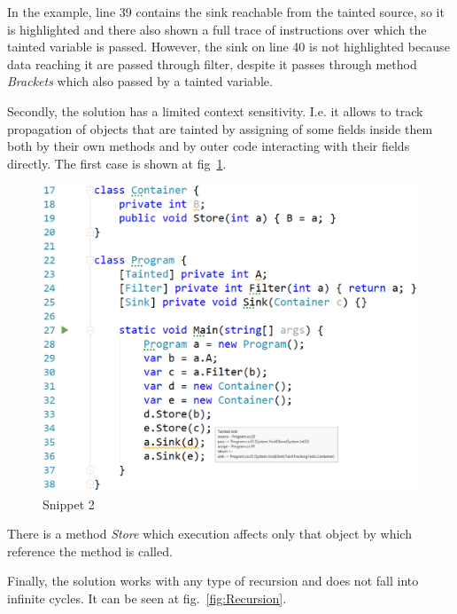 In the example, line 39 contains the sink reachable from the tainted source, so it is highlighted and there also shown a full trace of instructions over which the tainted variable is passed.
However, the sink on line 40 is not highlighted because data reaching it are passed through filter, despite it passes through method \textit{Brackets} which also passed by a tainted variable.

Secondly, the solution has a limited context sensitivity. I.e. it allows to track propagation of objects that are tainted by assigning of some fields inside them both by their own methods and by outer code interacting with their fields directly.
The first case is shown at fig~\ref{fig:ObjectTainting}.

\begin{figure}[h]
	\includegraphics[width=\linewidth]{screenshots/ContextSensitivity.png}
	\caption{Snippet 2}
	\label{fig:ObjectTainting}
\end{figure}

There is a method \textit{Store} which execution affects only that object by which reference the method is called.

Finally, the solution works with any type of recursion and does not fall into infinite cycles.
It can be seen at fig.~\ref{fig:Recursion}.

